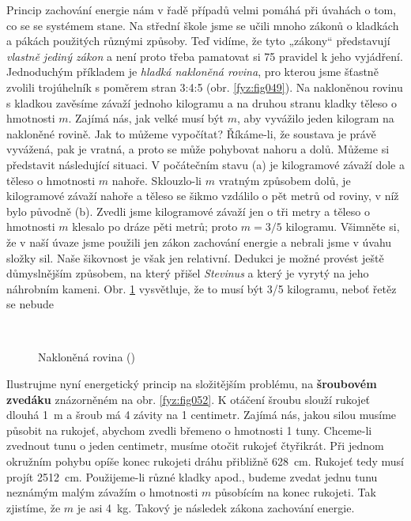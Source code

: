     Princip zachování energie nám v řadě případů velmi pomáhá při úvahách o tom, co se se systémem 
    stane. Na střední škole jsme se učili mnoho zákonů o kladkách a pákách použitých různými 
    způsoby. Teď vidíme, že tyto „zákony“ představují \emph{vlastně jediný zákon} a není proto 
    třeba pamatovat si \num{75} pravidel k jeho vyjádření. Jednoduchým příkladem je \emph{hladká 
    nakloněná rovina}, pro kterou jsme šťastně zvolili trojúhelník s poměrem stran 
    \num{3}:\num{4}:\num{5} (obr. \ref{fyz:fig049}). Na nakloněnou rovinu s kladkou zavěsíme závaží 
    jednoho kilogramu a na druhou stranu kladky těleso o hmotnosti \(m\). Zajímá nás, jak velké 
    musí být \(m\), aby vyvážilo jeden kilogram na nakloněné rovině. Jak to můžeme vypočítat? 
    Říkáme-li, že soustava je právě vyvážená, pak je vratná, a proto se může pohybovat nahoru a 
    dolů. Můžeme si představit následující situaci. V počátečním stavu (a) je kilogramové závaží 
    dole a těleso o hmotnosti \(m\) nahoře. Sklouzlo-li \(m\) vratným způsobem dolů, je kilogramové 
    závaží nahoře a těleso se šikmo vzdálilo o pět metrů od roviny, v níž bylo původně (b). Zvedli 
    jsme kilogramové závaží jen o tři metry a těleso o hmotnosti \(m\) klesalo po dráze pěti metrů; 
    proto \(m = 3/5\) kilogramu. Všimněte si, že v naší úvaze jsme použili jen zákon zachování 
    energie a nebrali jsme v úvahu složky sil. Naše šikovnost je však jen relativní. Dedukci je 
    možné provést ještě důmyslnějším způsobem, na který přišel \emph{Stevinus} a který je vyrytý na 
    jeho náhrobním kameni. Obr. \ref{fyz:fig050} vysvětluje, že to musí být 3/5 kilogramu, neboť 
    řetěz se nebude

    \begin{figure}[ht!]  %
      \centering
         \\
      \caption{Nakloněná rovina (\cite[s.~55]{Feynman01})}
      \label{fyz:fig050}
    \end{figure}
      
    Ilustrujme nyní energetický princip na složitějším problému, na \textbf{šroubovém zvedáku} 
    znázorněném na obr. \ref{fyz:fig052}. K otáčení šroubu slouží rukojeť dlouhá \SI{1}{\m} a šroub 
    má \num{4} závity na \num{1} centimetr. Zajímá nás, jakou silou musíme působit na rukojeť, 
    abychom zvedli břemeno o hmotnosti \num{1} tuny. Chceme-li zvednout tunu o jeden centimetr, 
    musíme otočit rukojeť čtyřikrát. Při jednom okružním pohybu opíše konec rukojeti dráhu 
    přibližně \SI{628}{\cm}. Rukojeť tedy musí projít \SI{2512}{\cm}. Použijeme-li různé kladky 
    apod., budeme zvedat jednu tunu neznámým malým závažím o hmotnosti \(m\) působícím na konec 
    rukojeti. Tak zjistíme, že \(m\) je asi \SI{4}{\kg}. Takový je následek zákona zachování 
    energie.


